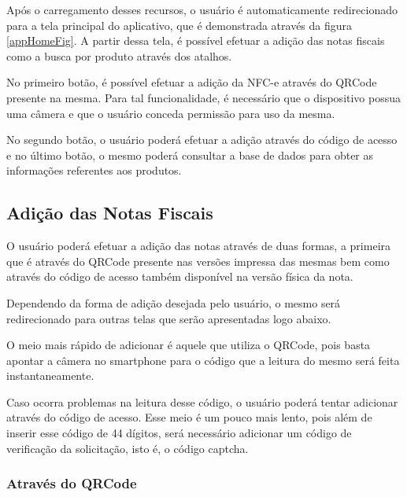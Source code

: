 Após o carregamento desses recursos, o usuário é automaticamente redirecionado para a tela principal do aplicativo, que é demonstrada através da figura \ref{appHomeFig}. A partir dessa tela, é possível efetuar a adição das notas fiscais como a busca por produto através dos atalhos.

No primeiro botão, é possível efetuar a adição da NFC-e através do QRCode presente na mesma. Para tal funcionalidade, é necessário que o dispositivo possua uma câmera e que o usuário conceda permissão para uso da mesma.

No segundo botão, o usuário poderá efetuar a adição através do código de acesso e no último botão, o mesmo poderá consultar a base de dados para obter as informações referentes aos produtos.

\subsection{Adição das Notas Fiscais}

O usuário poderá efetuar a adição das notas através de duas formas, a primeira que é através do QRCode presente nas versões impressa das mesmas bem como através do código de acesso também disponível na versão física da nota.

Dependendo da forma de adição desejada pelo usuário, o mesmo será redirecionado para outras telas que serão apresentadas logo abaixo.

O meio mais rápido de adicionar é aquele que utiliza o QRCode, pois basta apontar a câmera no smartphone para o código que a leitura do mesmo será feita instantaneamente.

Caso ocorra problemas na leitura desse código, o usuário poderá tentar adicionar através do código de acesso. Esse meio é um pouco mais lento, pois além de inserir esse código de 44 dígitos, será necessário adicionar um código de verificação da solicitação, isto é, o código captcha.

\subsubsection{Através do QRCode}

